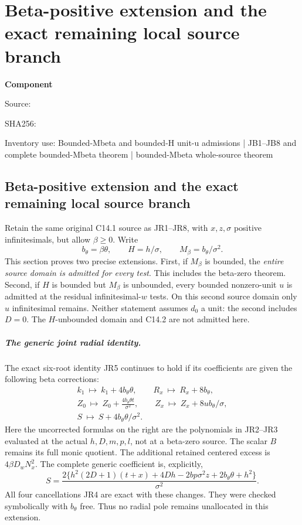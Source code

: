 \chapter{Beta-positive extension and the exact remaining local source branch}
\label{component:p909aa5765721}
\noindent\textbf{Component }\par
{\small\noindent Source: \par}
{\small\noindent SHA256: \par}
{\small\noindent Inventory use: Bounded-Mbeta and bounded-H unit-u admissions | JB1--JB8 and complete bounded-Mbeta theorem | bounded-Mbeta whole-source theorem\par}
\medskip
\section{Beta-positive extension and the exact remaining local source branch}
\label{p909aa5765721:sec:r13-beta-positive-extension}

Retain the same original C14.1 source as JR1--JR8, with $x,z,\sigma$
positive infinitesimals, but allow $\beta\ge0$. Write
\[
 b_\theta=\beta\theta,\qquad H=h/\sigma,\qquad
 M_\beta=b_\theta/\sigma^2.
\]
This section proves two precise extensions. First, if $M_\beta$ is
bounded, the \emph{entire source domain is admitted for every test}.
This includes the beta-zero theorem. Second, if $H$ is bounded but
$M_\beta$ is unbounded, every bounded nonzero-unit $u$ is admitted
at the residual infinitesimal-$w$ tests. On this second source domain
only $u$ infinitesimal remains. Neither statement assumes $d_0$ a
unit: the second includes $D=0$. The $H$-unbounded domain and C14.2
are not admitted here.

\paragraph{The generic joint radial identity.}
The exact six-root identity JR5 continues to hold if its coefficients
are given the following beta corrections:
\begin{gather*}
 k_1\ \mapsto\ k_1+4b_\theta\theta,\qquad
 R_x\ \mapsto\ R_x+8b_\theta,\\
 Z_0\ \mapsto\ Z_0+\frac{4b_\theta\theta t}{\sigma^2},\qquad
 Z_x\ \mapsto\ Z_x+8ub_\theta/\sigma,\\
 S\ \mapsto\ S+4b_\theta\theta/\sigma^2.
\tag{JB1}
\end{gather*}
Here the uncorrected formulas on the right are the polynomials in
JR2--JR3 evaluated at the actual $h,D,m,p,l$, not at a beta-zero
source. The scalar $B$ remains its full monic quotient. The additional
retained centered excess is $4\beta D_wN_x^2$. The complete generic
coefficient is, explicitly,
\[
 S=\frac{2\{h^2(2D+1)(t+x)+4Dh-2bp\sigma^2z
                       +2b_\theta\theta+h^2\}}{\sigma^2}.
\tag{JB2}
\]
All four cancellations JR4 are exact with these changes. They were
checked symbolically with $b_\theta$ free. Thus no radial pole remains
unallocated in this extension.

